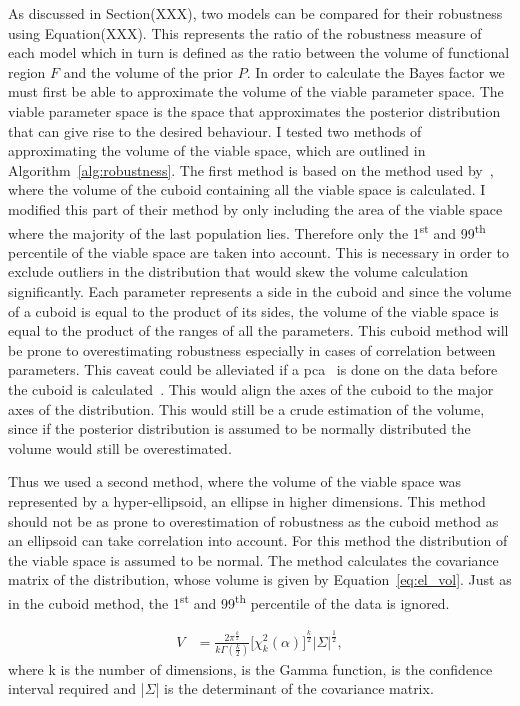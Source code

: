 As discussed in Section(XXX), two models can be compared for their robustness using Equation(XXX). This represents the ratio of the robustness measure of each model which in turn is defined as the ratio between the volume of functional region $F$ and the volume of the prior $P$. In order to calculate the Bayes factor we must first be able to approximate the volume of the viable parameter space. The viable parameter space is the space that approximates the posterior distribution that can give rise to the desired behaviour. I tested two methods of approximating the volume of the viable space, which are outlined in Algorithm~\ref{alg:robustness}. The first method is based on the method used by~\autocite{Hafner:2009ct}, where the volume of the cuboid containing all the viable space is calculated. I modified this part of their method by only including the area of the viable space where the majority of the last population lies. Therefore only the 1\textsuperscript{st} and 99\textsuperscript{th} percentile of the viable space are taken into account. This is necessary in order to exclude outliers in the distribution that would skew the volume calculation significantly. Each parameter represents a side in the cuboid and since the volume of a cuboid is equal to the product of its sides, the volume of the viable space is equal to the product of the ranges of all the parameters. This cuboid method will be prone to overestimating robustness especially in cases of correlation between parameters. This caveat could be alleviated if a \acrfull{pca}~\autocite{Fukunaga:2013wt} is done on the data before the cuboid is calculated~\autocite{Hafner:2009ct}. This would align the axes of the cuboid to the major axes of the distribution. This would still be a crude estimation of the volume, since if the posterior distribution is assumed to be normally distributed the volume would still be overestimated. 

Thus we used a second method, where the volume of the viable space was represented by a hyper-ellipsoid, an ellipse in higher dimensions. This method should not be as prone to overestimation of robustness as the cuboid method as an ellipsoid can take correlation into account. For this method the distribution of the viable space is assumed to be normal. The method calculates the covariance matrix of the distribution, whose volume is given by Equation~\ref{eq:el_vol}. Just as in the cuboid method, the 1\textsuperscript{st} and 99\textsuperscript{th} percentile of the data is ignored. 

\begin{align}
	V & = \frac{2\pi^{\frac{k}{2}}}{k\Gamma(\frac{k}{2})} \Big[ \chi _{k}^{2}(\alpha) \Big]^{\frac{k}{2}} |\Sigma|^\frac{1}{2}, \label{eq:el_vol}
\end{align}
\noindent where k is the number of dimensions, \textGamma{} is the Gamma function, \textalpha{} is the confidence interval required and |$\Sigma$| is the determinant of the covariance matrix. %


